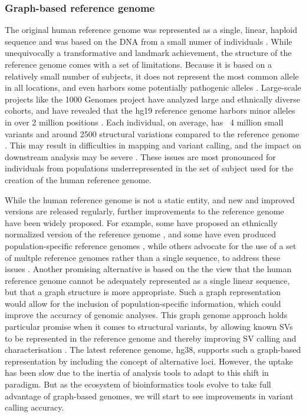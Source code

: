 \subsubsection{Graph-based reference genome}
The original human reference genome was represented as a single, linear, haploid sequence and was based on the DNA from a small numer of individuals \cite{venter2001sequence}.
While unequivocally a transformative and landmark achievement, the structure of the reference genome comes with a set of limitations. Because it is based on a relatively small number of subjects, it does not represent the most common allele in all locations, and even harbors some potentially pathogenic alleles \cite{barbitoff2018catching,koko2018challenges,ferrarini2015use}. Large-scale projects like the 1000 Genomes project \cite{10002010map} have analyzed large and ethnically diverse cohorts, and have revealed that the hg19 reference genome harbors minor alleles in over 2 million positions \cite{10002015global}.
Each individual, on average, has ~4 million small variants and around 2500 structural variations compared to the reference genome \cite{10002015global, sudmant2015integrated}. This may result in difficulties in mapping and variant calling, and the impact on downstream analysis may be severe \cite{karthikeyan2017hg19k}. These issues are most pronounced for individuals from populations underrepresented in the set of subject used for the creation of the human reference genome.

While the human reference genome is not a static entity, and new and improved versions are released regularly, further improvements to the reference genome have been widely proposed. For example, some have proposed an ethnically normalized version of the reference genome \cite{shukla2019hg19kindel}, and some have even produced population-specific reference genomes \cite{cho2016ethnically}, while others advocate for the use of a set of multple reference genomes rather than a single sequence, to address these issues \cite{schneeberger2009simultaneous,paten2017genome}. Another promising alternative is based on the the view that the human reference genome cannot be adequately represented as a single linear sequence, but that a graph structure is more appropriate. Such a graph representation would allow for the inclusion of population-specific information, which could improve the accuracy of genomic analyses. This graph genome approach holds particular promise when it comes to structural variants, by allowing known SVs to be represented in the reference genome and thereby improving SV calling and characterisation \cite{rakocevic2019fast}.
The latest reference genome, hg38, supports such a graph-based representation by including the concept of alternative loci. However, the uptake has been slow due to the inertia of analysis tools to adapt to this shift in paradigm. But as the ecosystem of bioinformatics tools evolve to take full advantage of graph-based genomes, we will start to see improvements in variant calling accuracy.

